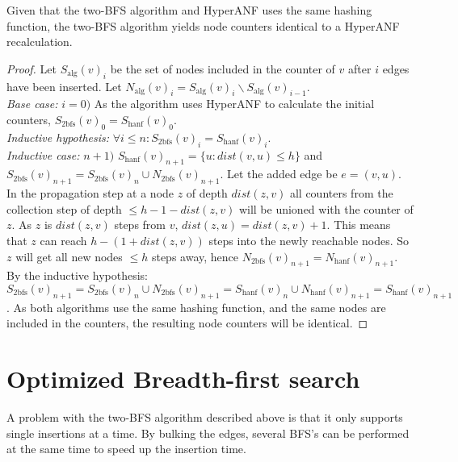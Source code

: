 \begin{theorem} Given that the two-BFS algorithm and HyperANF uses the same hashing function, the two-BFS algorithm yields node counters identical to a HyperANF recalculation.

\begin{proof}Let $S_\text{alg}(v)_i$ be the set of nodes included in the counter of $v$ after $i$ edges have been inserted. Let $N_\text{alg}(v)_i = S_\text{alg}(v)_i \backslash S_\text{alg}(v)_{i-1}$.\\

\noindent\textit{Base case:} $i = 0)$ As the algorithm uses HyperANF to calculate the initial counters, $S_\text{2bfs}(v)_0 = S_\text{hanf}(v)_0$.\\

\noindent\textit{Inductive hypothesis: } $\forall i \leq n : S_\text{2bfs}(v)_i = S_\text{hanf}(v)_i$.\\

\noindent\textit{Inductive case: } $n + 1)$  $S_\text{hanf}(v)_{n+1} = \{ u : dist(v,u) \leq h \}$ and $S_\text{2bfs}(v)_{n+1} = S_\text{2bfs}(v)_{n} \cup N_\text{2bfs}(v)_{n+1}$. Let the added edge be $e = (v,u)$. In the propagation step at a node $z$ of depth $dist(z,v)$ all counters from the collection step of depth $\leq h-1-dist(z,v)$ will be unioned with the counter of $z$. As $z$ is $dist(z,v)$ steps from $v$, $dist(z,u) = dist(z,v) + 1$. This means that $z$ can reach $h-(1+dist(z,v))$ steps into the newly reachable nodes. So $z$ will get all new nodes $\leq h$ steps away, hence $N_\text{2bfs}(v)_{n+1} = N_\text{hanf}(v)_{n+1}$. By the inductive hypothesis: $S_\text{2bfs}(v)_{n+1} = S_\text{2bfs}(v)_n \cup N_\text{2bfs}(v)_{n+1} = S_\text{hanf}(v)_n \cup N_\text{hanf}(v)_{n+1} = S_\text{hanf}(v)_{n+1}$. As both algorithms use the same hashing function, and the same nodes are included in the counters, the resulting node counters will be identical.

\end{proof}
\end{theorem}

\section{Optimized Breadth-first search}

A problem with the two-BFS algorithm described above is that it only supports single insertions at a time. By bulking the edges, several BFS's can be performed at the same time to speed up the insertion time. 

